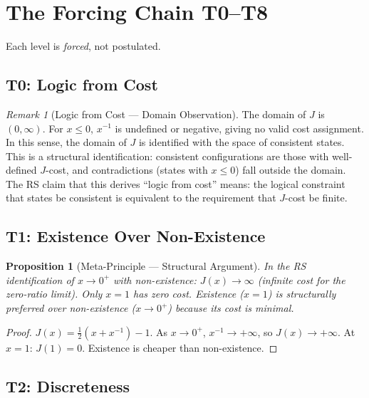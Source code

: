 \documentclass[12pt,a4paper]{article}
\newtheorem{proposition}[theorem]{Proposition}
\theoremstyle{definition}
\theoremstyle{remark}
\newtheorem{remark}[theorem]{Remark}
\begin{document}
\section{The Forcing Chain T0--T8}
\label{sec:chain}

Each level is \emph{forced}, not postulated.

\subsection{T0: Logic from Cost}

\begin{remark}[Logic from Cost --- Domain Observation]
The domain of $J$ is $(0, \infty)$.  For $x \leq 0$, $x^{-1}$ is
undefined or negative, giving no valid cost assignment.  In this sense,
the domain of $J$ is identified with the space of consistent states.
This is a structural identification: consistent configurations are those
with well-defined $J$-cost, and contradictions (states with $x \leq 0$)
fall outside the domain.  The RS claim that this derives ``logic from
cost'' means: the logical constraint that states be consistent is
equivalent to the requirement that $J$-cost be finite.
\end{remark}

\subsection{T1: Existence Over Non-Existence}

\begin{proposition}[Meta-Principle --- Structural Argument]
In the RS identification of $x \to 0^+$ with non-existence:
$J(x) \to \infty$ (infinite cost for the zero-ratio limit).
Only $x = 1$ has zero cost.  Existence ($x = 1$) is structurally
preferred over non-existence ($x \to 0^+$) because its cost is minimal.
\end{proposition}

\begin{proof}
$J(x) = \tfrac{1}{2}(x + x^{-1}) - 1$.  As $x \to 0^+$,
$x^{-1} \to +\infty$, so $J(x) \to +\infty$.  At $x = 1$:
$J(1) = 0$.  Existence is cheaper than non-existence.
\end{proof}

\subsection{T2: Discreteness}
\end{document}
